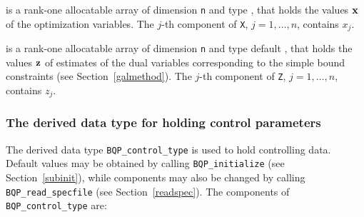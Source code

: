 \documentclass{galahad}
\newcommand{\packagename}{BQP}
\begin{document}
\begin{description}
 is a rank-one allocatable array of dimension {\tt n} and type 
\realdp, 
that holds the values ${\mathbf{x}}$ of the optimization variables.
The $j$-th component of {\tt X}, $j = 1,  \ldots , n$, contains $x_{j}$.  

 is a rank-one allocatable array of dimension {\tt n} and type default 
\realdp, that holds
the values ${\mathbf{z}}$ of estimates  of the dual variables 
corresponding to the simple bound constraints (see Section~\ref{galmethod}).
The $j$-th component of {\tt Z}, $j = 1,  \ldots ,  n$, contains $z_{j}$.  

\end{description}


\subsubsection{The derived data type for holding control 
 parameters}\label{typecontrol}
The derived data type 
{\tt \packagename\_control\_type} 
is used to hold controlling data. Default values may be obtained by calling 
{\tt \packagename\_initialize}
(see Section~\ref{subinit}),
while components may also be changed by calling 
{\tt \packagename\_read\-\_specfile}
(see Section~\ref{readspec}). 
The components of 
{\tt \packagename\_control\_type} 
are:
\end{document}
